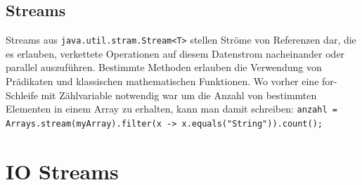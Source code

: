 \documentclass[12pt,a4]{article}
\begin{document}
	\subsection{Streams}
	Streams aus \texttt{java.util.stram.Stream<T>} stellen Ströme von Referenzen dar, die es erlauben, verkettete Operationen auf diesem Datenstrom nacheinander oder parallel auszuführen. Bestimmte Methoden erlauben die Verwendung von Prädikaten und klassischen mathematischen Funktionen. Wo vorher eine for-Schleife mit Zählvariable notwendig war um die Anzahl von bestimmten Elementen in einem Array zu erhalten, kann man damit schreiben: \texttt{anzahl = Arrays.stream(myArray).filter(x -> x.equals("String")).count();}
	
	\section{IO Streams}
	
	
	
	
	
	
	
	
	
\end{document}
